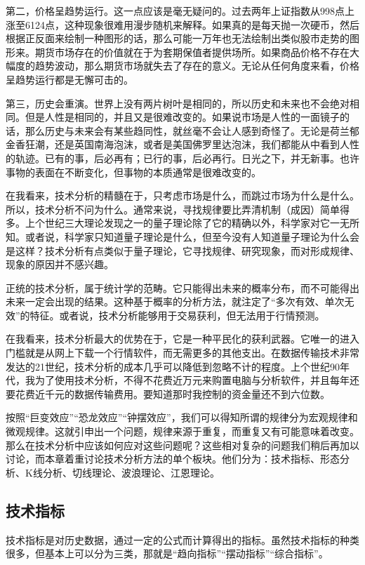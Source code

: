 第二，价格呈趋势运行。这一点应该是毫无疑问的。过去两年上证指数从998点上涨至6124点，这种现象很难用漫步随机来解释。如果真的是每天抛一次硬币，然后根据正反面来绘制一种图形的话，那么可能一万年也无法绘制出类似股市走势的图形来。期货市场存在的价值就在于为套期保值者提供场所。如果商品价格不存在大幅度的趋势波动，那么期货市场就失去了存在的意义。无论从任何角度来看，价格呈趋势运行都是无懈可击的。

第三，历史会重演。世界上没有两片树叶是相同的，所以历史和未来也不会绝对相同。但是人性是相同的，并且又是很难改变的。如果说市场是人性的一面镜子的话，那么历史与未来会有某些趋同性，就丝毫不会让人感到奇怪了。无论是荷兰郁金香狂潮，还是英国南海泡沫，或者是美国佛罗里达泡沫，我们都能从中看到人性的轨迹。已有的事，后必再有；已行的事，后必再行。日光之下，并无新事。也许事物的表面在不断变化，但事物的本质通常是很难改变的。

在我看来，技术分析的精髓在于，只考虑市场是什么，而跳过市场为什么是什么。所以，技术分析不问为什么。通常来说，寻找规律要比弄清机制（成因）简单得多。上个世纪三大理论发现之一的量子理论除了它的精确以外，科学家对它一无所知。或者说，科学家只知道量子理论是什么，但至今没有人知道量子理论为什么会是这样？技术分析有点类似于量子理论，它寻找规律、研究现象，而对形成规律、现象的原因并不感兴趣。

正统的技术分析，属于统计学的范畴。它只能得出未来的概率分布，而不可能得出未来一定会出现的结果。这种基于概率的分析方法，就注定了“多次有效、单次无效”的特征。或者说，技术分析能够用于交易获利，但无法用于行情预测。

在我看来，技术分析最大的优势在于，它是一种平民化的获利武器。它唯一的进入门槛就是从网上下载一个行情软件，而无需更多的其他支出。在数据传输技术非常发达的21世纪，技术分析的成本几乎可以降低到忽略不计的程度。上个世纪90年代，我为了使用技术分析，不得不花费近万元来购置电脑与分析软件，并且每年还要花费近千元的数据传输费用。要知道那时我控制的资金量还不到六位数。

按照“巨变效应”“恐龙效应”“钟摆效应”，我们可以得知所谓的规律分为宏观规律和微观规律。这就引申出一个问题，规律来源于重复，而重复又有可能意味着改变。那么在技术分析中应该如何应对这些问题呢？这些相对复杂的问题我们稍后再加以讨论，而本章着重讨论技术分析方法的单个板块。他们分为：技术指标、形态分析、K线分析、切线理论、波浪理论、江恩理论。

\subsection{技术指标}

技术指标是对历史数据，通过一定的公式而计算得出的指标。虽然技术指标的种类很多，但基本上可以分为三类，那就是“趋向指标”“摆动指标”“综合指标”。

